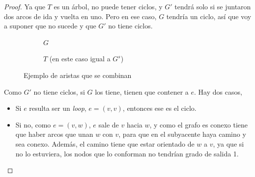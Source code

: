 \documentclass[12pt, a4paper]{report}
\theoremstyle{definition} %
\begin{document}
\begin{enumerate}[a)]
\begin{proof}
    Ya que $T$ es un árbol, no puede tener ciclos, y $G'$ tendrá solo si se juntaron dos arcos de ida y vuelta en uno. Pero en ese caso, $G$ tendría un ciclo, así que voy a suponer que no sucede y que $G'$ no tiene ciclos.

    \begin{figure}[H]
        \centering
        \begin{subfigure}{0.4\textwidth}
            \centering
            \caption*{$G$}
        \end{subfigure}
        \begin{subfigure}{0.4\textwidth}
            \centering
            \caption*{$T$ (en este caso igual a $G^s$)}
        \end{subfigure}
        \caption*{Ejemplo de aristas que se combinan}
    \end{figure}

    Como $G'$ no tiene ciclos, si $G$ los tiene, tienen que contener a $e$. Hay dos casos,

    \begin{itemize}
        \item Si $e$ resulta ser un \textit{loop}, $e = (v, v)$, entonces ese es el ciclo.
        \item Si no, como $e = (v, w)$, $e$ sale de $v$ hacia $w$, y como el grafo es conexo tiene que haber arcos que unan $w$ con $v$, para que en el subyacente haya camino y sea conexo. Además, el camino tiene que estar orientado de $w$ a $v$, ya que si no lo estuviera, los nodos que lo conforman no tendrían grado de salida 1.


\end{itemize}
\end{proof}
\end{enumerate}
\end{document}
